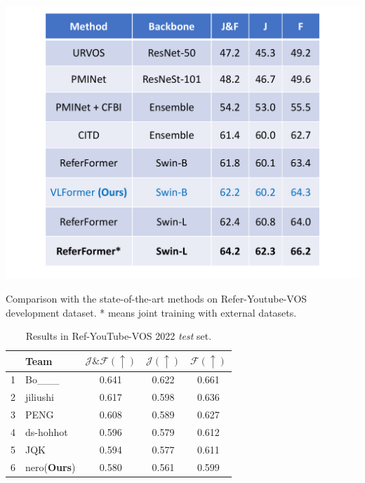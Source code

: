 
\begin{table}[ht]
    \centering
    \includegraphics[width=\textwidth]{content/resources/images/referring_segmentation/RefYoutubeVOS2022-SOTA.pdf}
    \caption{Comparison with the state-of-the-art methods on Refer-Youtube-VOS development dataset. * means joint training with external datasets.}
    \label{tab:refyoutube2022_dev}
\end{table}


\begin{table}
\centering
\begin{tabular}{@{}clccc@{}}
\toprule
 & Team & $\mathcal{J\&F}(\uparrow)$ & $\mathcal{J}(\uparrow)$ & $\mathcal{F}(\uparrow)$ \\
\midrule
1 & Bo\_\_\_ & 0.641 & 0.622 & 0.661 \\
2 & jiliushi & 0.617 & 0.598 & 0.636 \\
3 & PENG & 0.608 & 0.589 & 0.627 \\
4 & ds-hohhot & 0.596 & 0.579 & 0.612 \\
5 & JQK & 0.594 & 0.577 & 0.611 \\
6 & nero(\textbf{Ours}) & 0.580 & 0.561 & 0.599\\
\bottomrule
\end{tabular}
\caption{
% 
Results in Ref-YouTube-VOS 2022 \textit{test} set.
% 
} %
\label{tab:refyoutube2022}
\end{table}